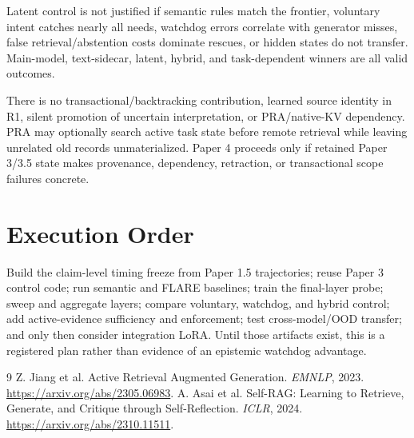 \documentclass[10pt]{article}
\begin{document}
Latent control is not justified if semantic rules match the frontier,
voluntary intent catches nearly all needs, watchdog errors correlate with
generator misses, false retrieval/abstention costs dominate rescues, or hidden
states do not transfer. Main-model, text-sidecar, latent, hybrid, and
task-dependent winners are all valid outcomes.

There is no transactional/backtracking contribution, learned source identity in
R1, silent promotion of uncertain interpretation, or PRA/native-KV dependency.
PRA may optionally search active task state before remote retrieval while
leaving unrelated old records unmaterialized. Paper 4 proceeds only if retained
Paper 3/3.5 state makes provenance, dependency, retraction, or transactional
scope failures concrete.

\section{Execution Order}
Build the claim-level timing freeze from Paper 1.5 trajectories; reuse Paper 3
control code; run semantic and FLARE baselines; train the final-layer probe;
sweep and aggregate layers; compare voluntary, watchdog, and hybrid control;
add active-evidence sufficiency and enforcement; test cross-model/OOD transfer;
and only then consider integration LoRA. Until those artifacts exist, this is a
registered plan rather than evidence of an epistemic watchdog advantage.

\begin{thebibliography}{9}
 Z. Jiang et al. Active Retrieval Augmented Generation.
\emph{EMNLP}, 2023. \url{https://arxiv.org/abs/2305.06983}.
 A. Asai et al. Self-RAG: Learning to Retrieve, Generate, and
Critique through Self-Reflection. \emph{ICLR}, 2024.
\url{https://arxiv.org/abs/2310.11511}.
\end{thebibliography}
\end{document}
